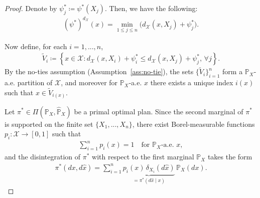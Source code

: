 \documentclass[10pt,a4paper]{amsart}
\begin{document}
\begin{proof}
	Denote by $\psi^{*}_j \coloneqq \psi^*(X_j)$. Then, we have the following:
	\begin{align*}
		(\psi^*)^{d_{\mathcal{X}}}(x) = \min_{1 \leq j \leq n} \bigl(d_{\mathcal{X}}(x,X_j) + \psi^*_j\bigr).		
	\end{align*}
	
	Now define, for each $i=1,...,n$,	
	\begin{align*}		
		\tilde{V}_i \coloneqq \left\{x \in \mathcal{X} : d_{\mathcal{X}}(x,X_i) + \psi^{*}_i \leq d_{\mathcal{X}}(x,X_j) + \psi^{*}_j , \, \forall j\right\}.	
	\end{align*}	
	By the no-ties assumption (Assumption~\ref{ass:no-tie}), the sets $\{\tilde{V}_i\}_{i=1}^n$ form a $\mathbb{P}_X$-a.e. partition of $\mathcal{X}$, and moreover for $\mathbb{P}_X$-a.e. $x$ there exists a unique index $i(x)$ such that $x \in \tilde{V}_{i(x)}$.
	
	Let $\pi^* \in \Pi(\mathbb{P}_X,\hat{\mathbb{P}}_X)$ be a primal optimal plan. Since the second marginal of $\pi^*$ is supported on the finite set $\{X_1,...,X_n\}$, there exist Borel-measurable functions $p_i : \mathcal{X} \to [0,1]$ such that	
	\begin{align*}		
		\sum_{i=1}^n p_i(x)=1 \quad \text{for }\mathbb{P}_X\text{-a.e. }x,		
	\end{align*}	
	and the disintegration of $\pi^*$ with respect to the first marginal $\mathbb{P}_X$ takes the form	
	\begin{align*}		
		\pi^*(dx,d\hat{x}) = \sum_{i=1}^n \underbrace{p_i(x) \, \delta_{X_i}(d\hat{x})}_{= \pi^*(d\hat{x} \mid x)} \, \mathbb{P}_X(dx) .		
	\end{align*}
	

\end{proof}
\end{document}
